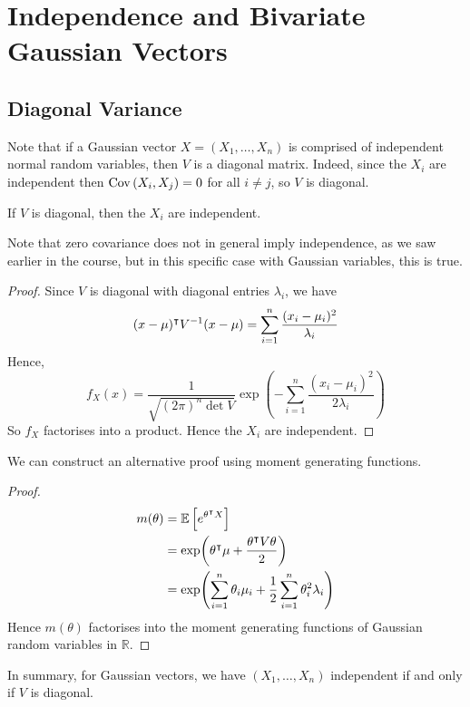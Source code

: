 \documentclass{article}
\begin{document}
\section{Independence and Bivariate Gaussian Vectors}
\subsection{Diagonal Variance}
Note that if a Gaussian vector $X = (X_1, \dots, X_n)$ is comprised of independent normal random variables, then $V$ is a diagonal matrix. Indeed, since the $X_i$ are independent then $\operatorname{Cov}\left({X_i, X_j}\right) = 0$ for all $i \neq j$, so $V$ is diagonal.
\begin{lemma}
	If $V$ is diagonal, then the $X_i$ are independent.
\end{lemma}
\noindent Note that zero covariance does not in general imply independence, as we saw earlier in the course, but in this specific case with Gaussian variables, this is true.
\begin{proof}
	Since $V$ is diagonal with diagonal entries $\lambda_i$, we have
	\[ (x-\mu)^\intercal V^{-1} (x-\mu) = \sum_{i=1}^n \frac{(x_i - \mu_i)^2}{\lambda_i} \]
	Hence,
	\[ f_X(x) = \frac{1}{\sqrt{(2\pi)^n \det V}} \exp(-\sum_{i=1}^n \frac{(x_i - \mu_i)^2}{2\lambda_i}) \]
	So $f_X$ factorises into a product. Hence the $X_i$ are independent.
\end{proof}
\noindent We can construct an alternative proof using moment generating functions.
\begin{proof}
	\begin{align*}
		m(\theta) & = \mathbb{E}\left[{e^{\theta^\intercal X}}\right]                                                 \\
		          & = \exp(\theta^\intercal \mu + \frac{\theta^\intercal V \theta}{2})               \\
		          & = \exp(\sum_{i=1}^n \theta_i \mu_i + \frac{1}{2}\sum_{i=1}^n \theta_i^2 \lambda_i)
	\end{align*}
	Hence $m(\theta)$ factorises into the moment generating functions of Gaussian random variables in $\mathbb R$.
\end{proof}
\noindent In summary, for Gaussian vectors, we have $(X_1, \dots, X_n)$ independent if and only if $V$ is diagonal.
\end{document}
